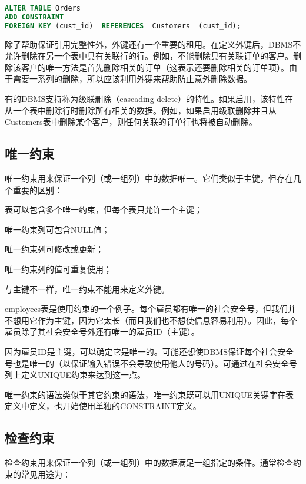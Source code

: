 \begin{lstlisting}[language=SQL]
ALTER TABLE Orders
ADD CONSTRAINT
FOREIGN KEY	(cust_id)  REFERENCES  Customers  (cust_id);
\end{lstlisting}


除了帮助保证引用完整性外，外键还有一个重要的租用。在定义外键后，DBMS不允许删除在另一个表中具有关联行的行。例如，不能删除具有关联订单的客户。删除该客户的唯一方法是首先删除相关的订单（这表示还要删除相关的订单项）。由于需要一系列的删除，所以应该利用外键来帮助防止意外删除数据。


有的DBMS支持称为级联删除（cascading delete）的特性。如果启用，该特性在从一个表中删除行时删除所有相关的数据。例如，如果启用级联删除并且从Customers表中删除某个客户，则任何关联的订单行也将被自动删除。

\subsection{唯一约束}


唯一约束用来保证一个列（或一组列）中的数据唯一。它们类似于主键，但存在几个重要的区别：

\begin{compactitem}
\item 表可以包含多个唯一约束，但每个表只允许一个主键；
\item 唯一约束列可包含NULL值；
\item 唯一约束列可修改或更新；
\item 唯一约束列的值可重复使用；
\item 与主键不一样，唯一约束不能用来定义外键。
\end{compactitem}

employees表是使用约束的一个例子。每个雇员都有唯一的社会安全号，但我们并不想用它作为主键，因为它太长（而且我们也不想使信息容易利用）。因此，每个雇员除了其社会安全号外还有唯一的雇员ID（主键）。

因为雇员ID是主键，可以确定它是唯一的。可能还想使DBMS保证每个社会安全号也是唯一的（以保证输入错误不会导致使用他人的号码）。可通过在社会安全号列上定义UNIQUE约束来达到这一点。

唯一约束的语法类似于其它约束的语法，唯一约束既可以用UNIQUE关键字在表定义中定义，也开始使用单独的CONSTRAINT定义。




\subsection{检查约束}

检查约束用来保证一个列（或一组列）中的数据满足一组指定的条件。通常检查约束的常见用途为：


